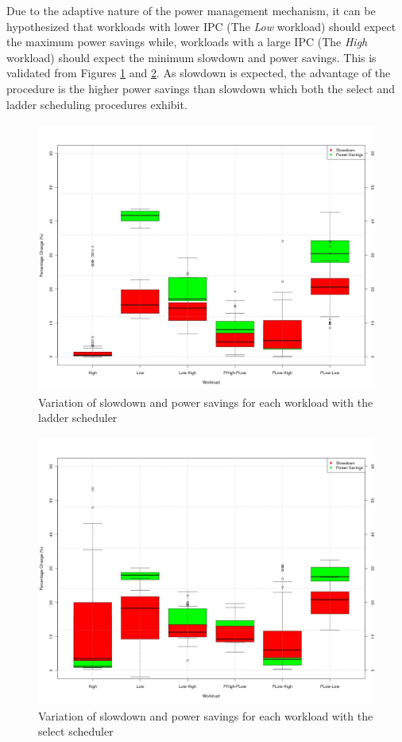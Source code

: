 Due to the adaptive nature of the power management mechanism, it can be hypothesized
that workloads with lower IPC (The \textit{Low} workload) should expect the maximum
power savings while, workloads with a large IPC (The \textit{High} workload) should
expect the minimum slowdown and power savings. This is validated from Figures \ref{fig:workload_trends_ladder}
and \ref{fig:workload_trends_select}. As slowdown is expected, the advantage of the procedure
is the higher power savings than slowdown which both the select and ladder scheduling
procedures exhibit. 

\begin{figure}[h!]
  \begin{center}
    \includegraphics[height=3.5in]{figures/trends_workload_ladder.jpg}%
    \caption{Variation of slowdown and power savings for each workload with the ladder scheduler}
    \label{fig:workload_trends_ladder}
  \end{center}
\end{figure}

\begin{figure}[h!]
  \begin{center}
    \includegraphics[height=3.5in]{figures/trends_workload_select.jpg}%
    \caption{Variation of slowdown and power savings for each workload with the select scheduler}
    \label{fig:workload_trends_select}
  \end{center}
\end{figure}


